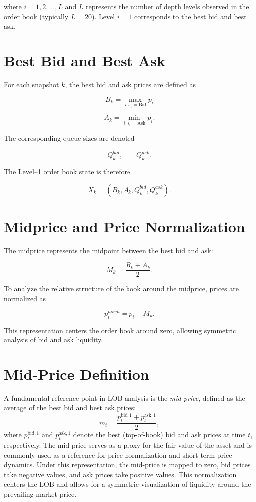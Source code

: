 \documentclass[12pt,a4paper]{report}
\begin{document}
where $i = 1,2,\dots,L$ and $L$ represents the number of depth levels observed in the order book (typically $L=20$). Level $i=1$ corresponds to the best bid and best ask.

\section{Best Bid and Best Ask}

For each snapshot $k$, the best bid and ask prices are defined as

\[
B_k = \max_{i:s_i=\text{Bid}} p_i
\]

\[
A_k = \min_{i:s_i=\text{Ask}} p_i.
\]

The corresponding queue sizes are denoted

\[
Q_k^{bid}, \qquad Q_k^{ask}.
\]

The Level--1 order book state is therefore

\[
X_k = (B_k, A_k, Q_k^{bid}, Q_k^{ask}).
\]

\section{Midprice and Price Normalization}

The midprice represents the midpoint between the best bid and ask:

\[
M_k = \frac{B_k + A_k}{2}.
\]

To analyze the relative structure of the book around the midprice, prices are normalized as

\[
p_i^{norm} = p_i - M_k.
\]

This representation centers the order book around zero, allowing symmetric analysis of bid and ask liquidity.


\section{Mid-Price Definition}

A fundamental reference point in LOB analysis is the \textit{mid-price}, defined as the average of the best bid and best ask prices:
\begin{equation}
    m_t = \frac{p_t^{\text{bid},1} + p_t^{\text{ask},1}}{2},
\end{equation}
where $p_t^{\text{bid},1}$ and $p_t^{\text{ask},1}$ denote the best (top-of-book) bid and ask prices at time $t$, respectively. The mid-price serves as a proxy for the fair value of the asset and is commonly used as a reference for price normalization and short-term price dynamics.
Under this representation, the mid-price is mapped to zero, bid prices take negative values, and ask prices take positive values. This normalization centers the LOB and allows for a symmetric visualization of liquidity around the prevailing market price.
\end{document}

